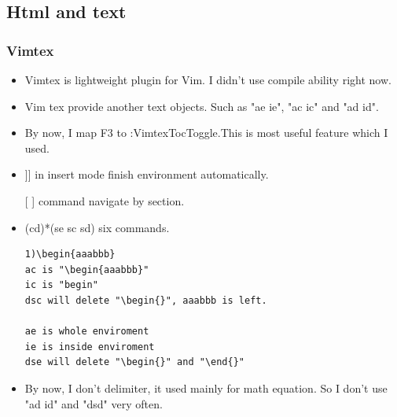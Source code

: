 \documentclass[a4paper,11pt,twoside]{book}
\begin{document}
\subsection{Html and text}

\subsubsection{Vimtex}
\begin{itemize}
		\item Vimtex is lightweight plugin for Vim. I didn't use compile ability right now. 
				
		\item Vim tex provide another text objects. Such as "ae ie", "ac ic" and "ad id". 
				
		\item By now, I map F3 to :VimtexTocToggle.This is most useful feature which I used. 
				
		\item ]] in insert mode finish environment automatically.
				
		\item [[ ]] command navigate by section.
				
		\item (cd)*(se sc sd) six commands. 
\begin{verbatim}
1)\begin{aaabbb}
ac is "\begin{aaabbb}"
ic is "begin"
dsc will delete "\begin{}", aaabbb is left.

ae is whole enviroment
ie is inside enviroment
dse will delete "\begin{}" and "\end{}" 
\end{verbatim}
	\item By now, I don't delimiter, it used mainly for math equation. So I don't use "ad id" and "dsd" very often. 
\end{itemize}
\end{document}
